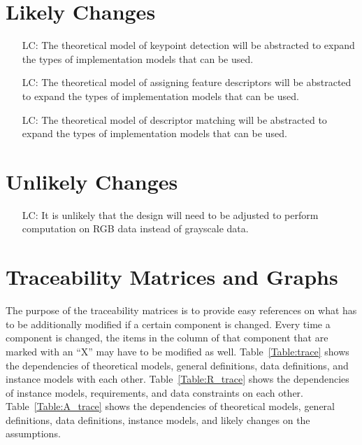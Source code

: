 \documentclass[12pt]{article}
\newcounter{lcnum} %
\begin{document}
\section{Likely Changes} 
\noindent \begin{itemize}

\item[LC\refstepcounter{lcnum}\thelcnum\label{LC_keypoint_method}:] 
The theoretical model of keypoint detection will be abstracted to expand the types of 
implementation models that can be used.

\item[LC\refstepcounter{lcnum}\thelcnum\label{LC_descriptor_method}:] 
The theoretical model of assigning feature descriptors will be abstracted to expand the types of 
implementation models that can be used.

\item[LC\refstepcounter{lcnum}\thelcnum\label{LC_comparison_method}:] 
The theoretical model of descriptor matching will be abstracted to expand the types of 
implementation models that can be used.

\end{itemize}

\section{Unlikely Changes}    

\noindent \begin{itemize}

\item[LC\refstepcounter{lcnum}\thelcnum\label{RGB_Data}:] It is unlikely that the design 
will need to be adjusted to perform computation on RGB data instead of grayscale data.

\end{itemize}

\section{Traceability Matrices and Graphs}

The purpose of the traceability matrices is to provide easy references on what
has to be additionally modified if a certain component is changed.  Every time a
component is changed, the items in the column of that component that are marked
with an ``X'' may have to be modified as well.  Table~\ref{Table:trace} shows the
dependencies of theoretical models, general definitions, data definitions, and
instance models with each other. Table~\ref{Table:R_trace} shows the
dependencies of instance models, requirements, and data constraints on each
other. Table~\ref{Table:A_trace} shows the dependencies of theoretical models,
general definitions, data definitions, instance models, and likely changes on
the assumptions.
\end{document}

